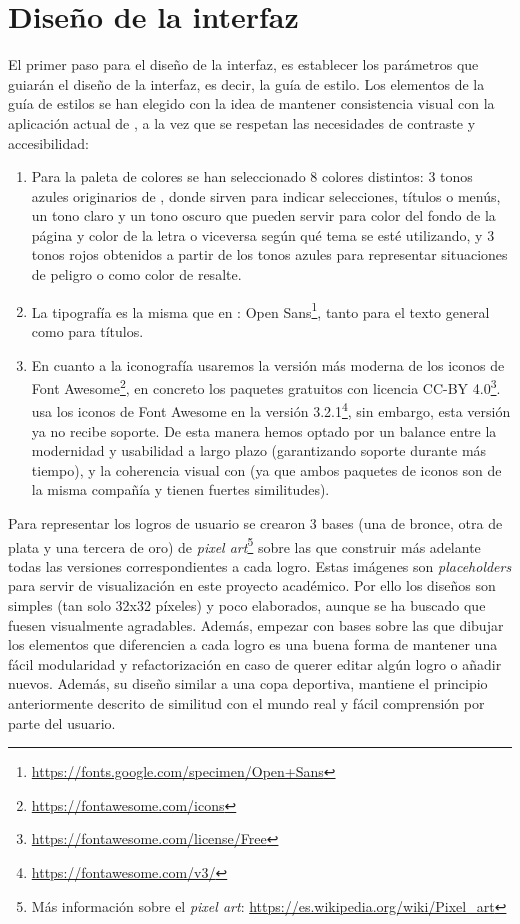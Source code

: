 \section{Diseño de la interfaz}
El primer paso para el diseño de la interfaz, es establecer los parámetros que guiarán el diseño de la interfaz, es decir, la guía de estilo. Los elementos de la guía de estilos se han elegido con la idea de mantener consistencia visual con la aplicación actual de \aer, a la vez que se respetan las necesidades de contraste y accesibilidad:
\begin{enumerate}
    \item Para la paleta de colores se han seleccionado 8 colores distintos: 3 tonos azules originarios de \aer, donde sirven para indicar selecciones, títulos o menús, un tono claro y un tono oscuro que pueden servir para color del fondo de la página y color de la letra o viceversa según qué tema se esté utilizando, y 3 tonos rojos obtenidos a partir de los tonos azules para representar situaciones de peligro o como color de resalte. 
    \item La tipografía es la misma que en \aer: Open Sans\footnote{\url{https://fonts.google.com/specimen/Open+Sans}}, tanto para el texto general como para títulos.
    \item En cuanto a la iconografía usaremos la versión más moderna de los iconos de Font Awesome\footnote{\url{https://fontawesome.com/icons}}, en concreto los paquetes gratuitos con licencia CC-BY 4.0\footnote{\url{https://fontawesome.com/license/Free}}. \aer usa los iconos de Font Awesome en la versión 3.2.1\footnote{\url{https://fontawesome.com/v3/}}, sin embargo, esta versión ya no recibe soporte. De esta manera hemos optado por un balance entre la modernidad y usabilidad a largo plazo (garantizando soporte durante más tiempo), y la coherencia visual con \aer (ya que ambos paquetes de iconos son de la misma compañía y tienen fuertes similitudes). 
\end{enumerate}

Para representar los logros de usuario se crearon 3 bases (una de bronce, otra de plata y una tercera de oro) de \textit{pixel art}\footnote{Más información sobre el \textit{pixel art}: \url{https://es.wikipedia.org/wiki/Pixel_art}} sobre las que construir más adelante todas las versiones correspondientes a cada logro. Estas imágenes son \textit{placeholders} para servir de visualización en este proyecto académico. Por ello los diseños son simples (tan solo 32x32 píxeles) y poco elaborados, aunque se ha buscado que fuesen visualmente agradables. Además, empezar con bases sobre las que dibujar los elementos que diferencien a cada logro es una buena forma de mantener una fácil modularidad y refactorización en caso de querer editar algún logro o añadir nuevos. Además, su diseño similar a una copa deportiva, mantiene el principio anteriormente descrito de similitud con el mundo real y fácil comprensión por parte del usuario.


